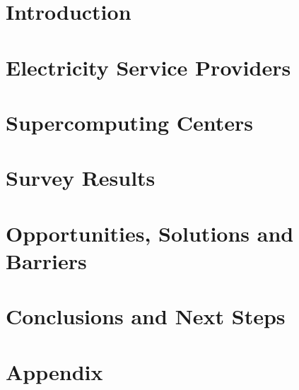 \documentclass{../style/sig-alternate}
\begin{document}


%
\section{Introduction}
\label{sec:intro}


\section{Electricity Service Providers}
\label{sec:ESPintegration}


\section{Supercomputing Centers} %
\label{sec:supercomputercenters}


\section{Survey Results} %
\label{sec:questionnaire}


\section{Opportunities, Solutions and\\ Barriers} 

\label{sec:opportunities}

\section{Conclusions and Next Steps}

\label{sec:conclusion}

%
%

%

%

\section*{Appendix}
\label{Appendix}

\end{document}
